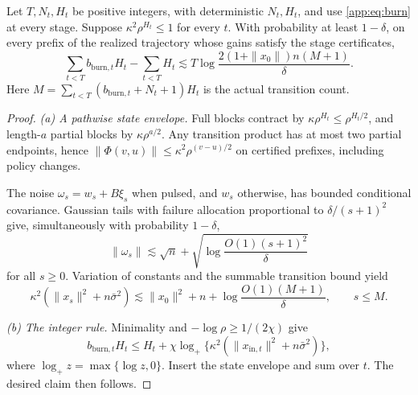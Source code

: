 \begin{lemma}\label{app:lem:burn}
Let $T,N_t,H_t$ be positive integers, with deterministic $N_t,H_t$,
and use \eqref{app:eq:burn} at every stage. Suppose
$\kappa^2\rho^{H_t}\le1$ for every $t$.
With probability at least $1-\delta$, on every prefix of the realized
trajectory whose gains satisfy the stage certificates,
\[
 \sum_{t<T}b_{{\mathrm{burn}},t}H_t-\sum_{t<T}H_t
 \lesssim T\log\frac{2(1+\|x_0\|)n(M+1)}\delta .
\]
Here $M=\sum_{t<T}(b_{{\mathrm{burn}},t}+N_t+1)H_t$ is the actual
transition count.
\end{lemma}
\begin{proof}
\emph{(a) A pathwise state envelope.}
Full blocks contract by $\kappa\rho^{H_t}\le\rho^{H_t/2}$,
and length-$a$ partial blocks by $\kappa\rho^{a/2}$.
Any transition product has at most two partial endpoints, hence
$\|\Phi(v,u)\|\le\kappa^2\rho^{(v-u)/2}$ on certified prefixes,
including policy changes.

The noise $\omega_s=w_s+B\xi_s$ when pulsed, and $w_s$ otherwise,
has bounded conditional covariance.
Gaussian tails with failure allocation proportional to
$\delta/(s+1)^2$ give, simultaneously with probability $1-\delta$,
\[
 \|\omega_s\|\lesssim\sqrt{n}+
            \sqrt{\log\frac{O(1)(s+1)^2}\delta}
\]
for all $s\ge0$.
Variation of constants and the summable transition bound yield
\[
 \kappa^2(\|x_s\|^2+n\bar\sigma^2)
 \lesssim \|x_0\|^2+n+\log\frac{O(1)(M+1)}\delta,\qquad s\le M.
\]

\emph{(b) The integer rule.}
Minimality and $-\log\rho\ge1/(2\chi)$ give
\[
 b_{{\mathrm{burn}},t}H_t
 \le H_t+\chi\log_+\{\kappa^2(\|x_{{\mathrm{in}},t}\|^2+n\bar\sigma^2)\},
\]
where $\log_+z=\max\{\log z,0\}$.
Insert the state envelope and sum over $t$.
The desired claim then follows.
\end{proof}

